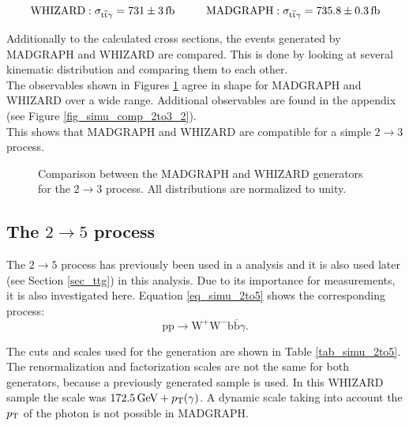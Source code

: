 \begin{equation}
\mathrm{WHIZARD: }\; \sigma_{\ttgamma} = \SI{731 \pm 3}{\femto \barn} \hspace{1.cm} \mathrm{MADGRAPH: }\;  \sigma_{\ttgamma} = \SI{735.8 \pm 0.3}{\femto \barn}
\label{eq_simu_2to3_cross}
\end{equation}

Additionally to the calculated cross sections, the events generated by MADGRAPH and WHIZARD are compared. This is done by looking  at several kinematic distribution and comparing them to each other. \\
The observables shown in Figures \ref{fig_simu_comp_2to3_1} agree in shape for MADGRAPH and WHIZARD over a wide range. Additional observables are found in the appendix (see Figure \ref{fig_simu_comp_2to3_2}).\\
This shows that MADGRAPH and WHIZARD are compatible for a simple $2 \to 3$ process.
 \newpage
\begin{figure}[ht]
\centering
  \caption{Comparison between the MADGRAPH and WHIZARD generators for the $2 \to 3$ process. All distributions are normalized to unity.}
  \label{fig_simu_comp_2to3_1}
\end{figure}


\FloatBarrier
\subsection{The $2 \to 5$ process}
\label{sec_simu_comp_2to5}

The $2 \to 5$ process has previously been used in a \ttgamma analysis \cite{CMS-PAS-TOP-13-011} and it is also used later (see Section \ref{sec_ttg}) in this analysis. Due to its importance for \ttgamma measurements, it is also investigated here. Equation \ref{eq_simu_2to5} shows the corresponding process: \\

\begin{equation}
\mathrm{pp} \to \mathrm{W}^+ \mathrm{W}^- \mathrm{b} \overline{\mathrm{b}} \gamma.
\label{eq_simu_2to5}
\end{equation}

The cuts and scales used for the generation are shown in Table \ref{tab_simu_2to5}. The renormalization and factorization scales are not the same for both generators, because a previously generated sample is used. In this WHIZARD sample the scale was $\SI{172.5}{\giga \electronvolt} + p_{\mathrm{T}}(\gamma)$. A dynamic scale taking into account the $p_{\mathrm{T}}$ of the photon is not possible in MADGRAPH.\\

